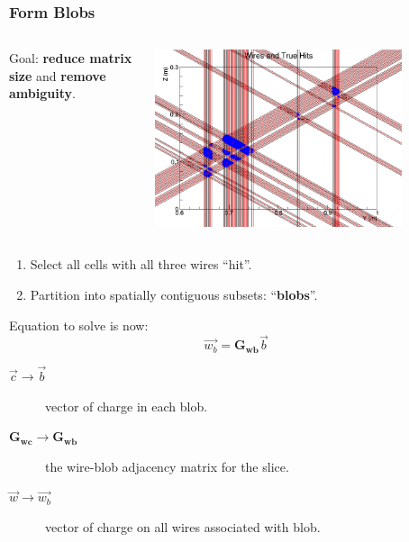 \documentclass[xcolor=dvipsnames]{beamer}
\begin{document}
\begin{frame}
  \frametitle{Form Blobs}
  \vspace{-10mm}
  \begin{columns}
    \begin{column}{0.5\textwidth}
      Goal: \textbf{reduce matrix size} and \textbf{remove ambiguity}.
    \end{column}
    \begin{column}{0.5\textwidth}
      \includegraphics[width=0.8\textwidth]{wires-and-true-hits.png}          
    \end{column}
  \end{columns}
      
  \begin{enumerate}
  \item Select all cells with all three wires ``hit''.
  \item Partition into spatially contiguous subsets: ``\textbf{blobs}''.
  \end{enumerate}
  Equation to solve is now:
  \[\vec{w_b} = \mathbf{G_{wb}} \vec{b}\]

  \begin{description}
  \item[$\vec{c} \to \vec{b}$] vector of charge in each blob.
  \item[$\mathbf{G_{wc}} \to \mathbf{G_{wb}}$] the wire-blob adjacency matrix for the slice.
  \item[$\vec{w} \to \vec{w_b}$] vector of charge on all wires associated with blob.
  \end{description}

\end{frame}
\end{document}
